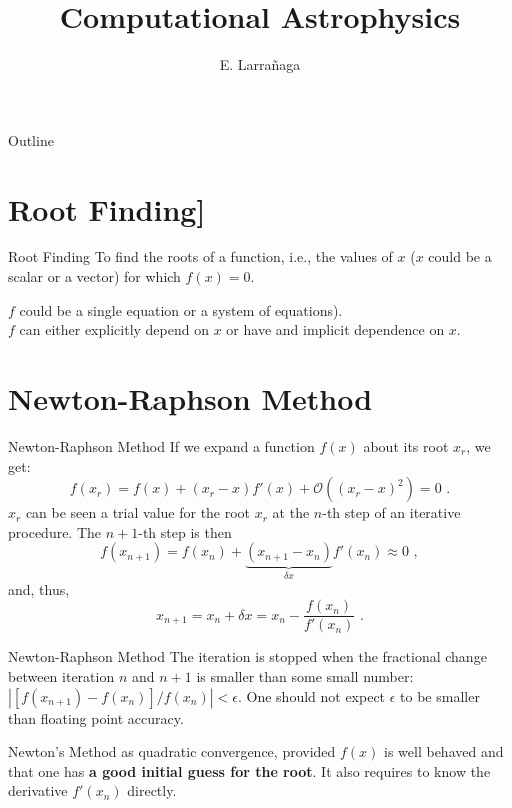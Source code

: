 \documentclass[11pt]{beamer}
\begin{document}
\begin{frame}
\title{Computational Astrophysics}
\author{E. Larrañaga}
\titlepage
\end{frame}

\begin{frame}{Outline}
\tableofcontents
\end{frame}

\section{Root Finding]}

\begin{frame}[fragile]{Root Finding}
To find the roots of a function, i.e., the values of 
$x$ ($x$ could be a scalar or a vector) for which $f(x) = 0$.\\
\pause
\bigskip

$f$ could be a single equation or a system of equations).\\
$f$ can either explicitly depend on $x$ or have and implicit dependence on $x$.
\end{frame}



\section{Newton-Raphson Method}

\begin{frame}[fragile]{Newton-Raphson Method}
If we expand a function $f(x)$ about its root $x_r$, we get: 
\begin{equation}
f(x_r) = f(x) + (x_r - x) f'(x) +  \mathcal{O}( (x_r - x)^2) = 0\,\,.
\end{equation}
$x_r$ can be seen a trial value for the root $x_r$ at the
$n$-th step of an iterative procedure. The $n+1$-th step is then
\begin{equation}
f(x_{n+1}) = f(x_n) + \underbrace{(x_{n+1} - x_{n})}_{\delta x}
f'(x_n) \approx 0\,\,,
\end{equation}
and, thus,
\begin{equation}
x_{n+1} = x_n + \delta x = x_n - \frac{f(x_n)}{f'(x_n)}\,\,.
\end{equation}
\end{frame}

\begin{frame}[fragile]{Newton-Raphson Method}
The iteration is stopped when the
fractional change between iteration $n$ and $n+1$ is smaller than some
small number: $|[f(x_{n+1}) - f(x_{n})]/f({x_n})| < \epsilon$. One should not
expect $\epsilon$ to be smaller than floating point accuracy.\\
\bigskip

Newton's Method as quadratic convergence, provided $f(x)$ is well
behaved and that one has \textbf{a good initial guess for the root}. It also
requires  to know the derivative $f'(x_n)$ directly. 
\end{frame}
\end{document}
